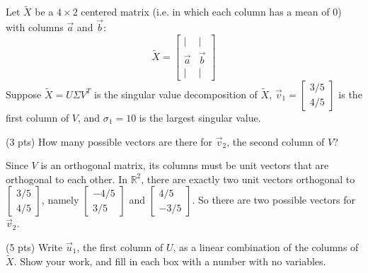 \documentclass[11pt]{article}
\begin{document}
\newpage

\begin{prob}[(12 pts)]
Let $\tilde X$ be a $4 \times 2$ centered matrix (i.e. in which each column has a mean of 0) with columns $\vec a$ and $\vec b$: $$\tilde X = \begin{bmatrix} \mid & \mid \\ \vec a & \vec b \\ \mid & \mid \end{bmatrix}$$
Suppose $\tilde X = U \Sigma V^T$ is the singular value decomposition of $\tilde X$, $\vec v_1 = \begin{bmatrix}3/5\\4/5\end{bmatrix}$ is the first column of $V$, and $\sigma_1 = 10$ is the largest singular value.

\begin{subprob}(3 pts) How many possible vectors are there for $\vec v_2$, the second column of $V$? \\
    
\begin{solution}
Since $V$ is an orthogonal matrix, its columns must be unit vectors that are orthogonal to each other. In $\mathbb{R}^2$, there are exactly two unit vectors orthogonal to $\begin{bmatrix}3/5\\4/5\end{bmatrix}$, namely $\begin{bmatrix}-4/5\\3/5\end{bmatrix}$ and $\begin{bmatrix}4/5\\-3/5\end{bmatrix}$.
So there are two possible vectors for $\vec{v}_2$.
\end{solution}
\end{subprob}

\begin{subprob}(5 pts) Write $\vec u_1$, the first column of $U$, as a linear combination of the columns of $\tilde X$. Show your work, and fill in each box with a number with no variables. \\



\end{subprob}
\end{prob}
\end{document}
